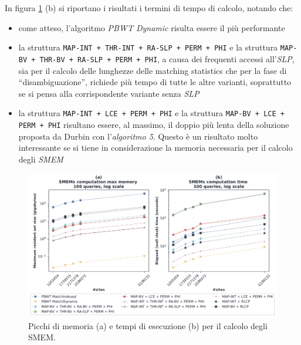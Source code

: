 In figura \ref{fig:smemtimememchr} (b) si riportano i risultati i termini di tempo di
calcolo, notando che:
\begin{itemize}
  \item come atteso, l'algoritmo \textit{PBWT Dynamic} risulta essere il più
  performante
  \item la struttura \texttt{MAP-INT + THR-INT + RA-SLP + PERM + PHI} e la
  struttura 
  \texttt{MAP-BV + THR-BV + RA-SLP + PERM + PHI}, a causa dei
  frequenti accessi all'\textit{SLP}, sia per il calcolo delle lunghezze delle
  matching statistics che per la fase di ``disambiguazione'', richiede più tempo
  di tutte le altre varianti, soprattutto se si pensa alla corrispondente
  variante senza \textit{SLP}
  \item la struttura \texttt{MAP-INT + LCE + PERM + PHI} e la struttura
  \texttt{MAP-BV + LCE + PERM + PHI} risultano essere, al massimo,
  il doppio più lenta della soluzione proposta da Durbin con l'\textit{algoritmo
    5}. Questo è un risultato 
  molto interessante se si tiene in considerazione la memoria necessaria per il
  calcolo degli \textit{SMEM}
\end{itemize}
\begin{figure}
  \centering
  \includegraphics[width=\linewidth]{img/exe_time_mem_paper}
  \caption{Picchi di memoria (a) e tempi di esecuzione (b) per il calcolo degli
    SMEM.}
  \label{fig:smemtimememchr}
\end{figure}
